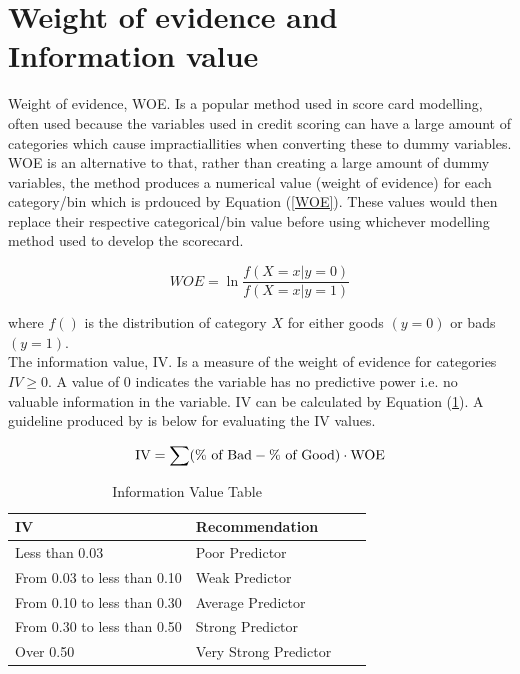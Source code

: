 \section{Weight of evidence and Information value}  \label{sec:woe_and_iv}

Weight of evidence, WOE. Is a popular method used in score card modelling, often used because the variables used in credit scoring can have a large amount of categories which cause impractiallities when converting these to dummy variables. WOE is an alternative to that, rather than creating a large amount of dummy variables, the method produces a numerical value (weight of evidence) for each category/bin which is prdouced by Equation (\ref{WOE}). These values would then replace their respective categorical/bin value before using whichever modelling method used to develop the scorecard.

\begin{equation}\label{WOE}
WOE = \ln \frac{f(X=x|y=0)}{f(X=x|y=1)}
\end{equation}

where $f()$ is the distribution of category $X$ for either goods $(y=0)$ or bads $(y=1)$. \\

The information value, IV. Is a measure of the weight of evidence for categories $IV \geq 0$. A value of 0 indicates the variable has no predictive power i.e. no valuable information in the variable. IV can be calculated by Equation (\ref{IV}). A guideline produced by \parencite{bailey2004credit} is below for evaluating the IV values.

\begin{equation}\label{IV}
\textup{IV} = \sum (\% \textup{ of Bad} - \% \textup{ of Good}) \cdot \textup{WOE}
\end{equation}

\begin{table}[H]
	\centering
	\begin{tabular}{l l l l}
	IV	&Recommendation \\
	\hline
	Less than 0.03			&Poor Predictor \\
	From 0.03 to less than 0.10	&Weak Predictor \\
	From 0.10 to less than 0.30	&Average Predictor \\
	From 0.30 to less than 0.50	&Strong Predictor \\
	Over 0.50				&Very Strong Predictor \\
	\end{tabular}
	\caption{Information Value Table \label{IV}}\parencite{bailey2004credit}
\end{table}


